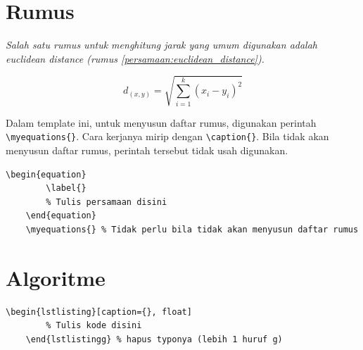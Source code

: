 \section{Rumus}

\textit{Salah satu rumus untuk menghitung jarak yang umum digunakan adalah euclidean distance (rumus \ref{persamaan:euclidean_distance}).}

\begin{equation}
    \label{persamaan:euclidean_distance}
    d_{(x,y)} = \sqrt{\sum_{i=1}^{k} (x_i - y_i)^2}
\end{equation}

Dalam template ini, untuk menyusun daftar rumus, digunakan perintah \verb|\myequations{}|. Cara kerjanya mirip dengan \verb|\caption{}|. Bila tidak akan menyusun daftar rumus, perintah tersebut tidak usah digunakan.

\begin{lstlisting}[caption={Kode Latex untuk rumus}]
    \begin{equation}
        \label{}
        % Tulis persamaan disini 
    \end{equation}
    \myequations{} % Tidak perlu bila tidak akan menyusun daftar rumus
\end{lstlisting}

\section{Algoritme}

\begin{lstlisting}[caption={Kode Latex untuk algoritme}]
    \begin{lstlisting}[caption={}, float]
        % Tulis kode disini
    \end{lstlistingg} % hapus typonya (lebih 1 huruf g)
\end{lstlisting}